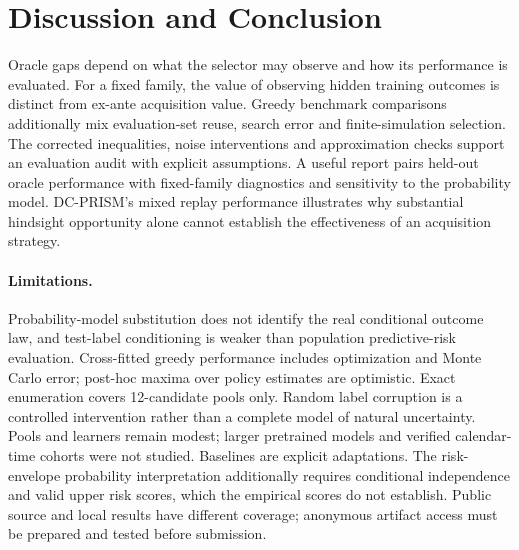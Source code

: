 \documentclass[runningheads]{llncs}
\begin{document}
\section{Discussion and Conclusion}
\label{sec:conclusion}
Oracle gaps depend on what the selector may observe and how its performance is evaluated. For a fixed family, the value of observing hidden training outcomes is distinct from ex-ante acquisition value. Greedy benchmark comparisons additionally mix evaluation-set reuse, search error and finite-simulation selection. The corrected inequalities, noise interventions and approximation checks support an evaluation audit with explicit assumptions. A useful report pairs held-out oracle performance with fixed-family diagnostics and sensitivity to the probability model. DC-PRISM's mixed replay performance illustrates why substantial hindsight opportunity alone cannot establish the effectiveness of an acquisition strategy.

\paragraph{Limitations.} Probability-model substitution does not identify the real conditional outcome law, and test-label conditioning is weaker than population predictive-risk evaluation. Cross-fitted greedy performance includes optimization and Monte Carlo error; post-hoc maxima over policy estimates are optimistic. Exact enumeration covers 12-candidate pools only. Random label corruption is a controlled intervention rather than a complete model of natural uncertainty. Pools and learners remain modest; larger pretrained models and verified calendar-time cohorts were not studied. Baselines are explicit adaptations. The risk-envelope probability interpretation additionally requires conditional independence and valid upper risk scores, which the empirical scores do not establish. Public source and local results have different coverage; anonymous artifact access must be prepared and tested before submission.



\end{document}
